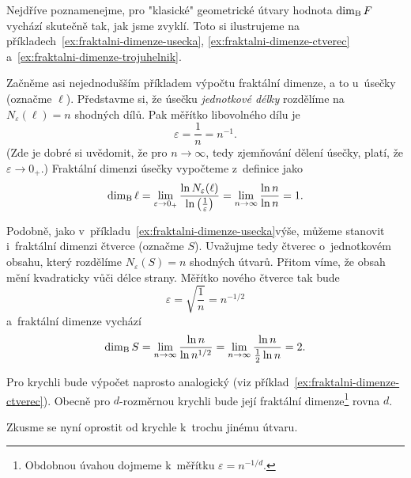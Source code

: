 Nejdříve poznamenejme, pro "klasické" geometrické útvary hodnota $\operatorname{dim_B}{F}$ vychází skutečně tak, jak jsme zvyklí. Toto si ilustrujeme na příkladech~\ref{ex:fraktalni-dimenze-usecka}, \ref{ex:fraktalni-dimenze-ctverec} a~\ref{ex:fraktalni-dimenze-trojuhelnik}.
\begin{example}\label{ex:fraktalni-dimenze-usecka}
    Začněme asi nejednodušším příkladem výpočtu fraktální dimenze, a to u~úsečky (označme $\ell$). Představme si, že úsečku \emph{jednotkové délky} rozdělíme na $N_\varepsilon(\ell)=n$ shodných dílů. Pak měřítko libovolného dílu je
    \[\varepsilon=\dfrac{1}{n}=n^{-1}.\]
    (Zde je dobré si uvědomit, že pro $n\to\infty$, tedy zjemňování dělení úsečky, platí, že $\varepsilon\to 0_+$.) Fraktální dimenzi úsečky vypočteme z~definice jako
    \[\operatorname{dim_B}{\ell}=\lim_{\varepsilon\to 0_+}{\dfrac{\ln{N_\varepsilon(\ell)}}{\ln{\left(\frac{1}{\varepsilon}\right)}}}=\lim_{n\to\infty}{\dfrac{\ln{n}}{\ln{n}}}=1.\]
\end{example}
\begin{example}\label{ex:fraktalni-dimenze-ctverec}
    Podobně, jako v~příkladu~\ref{ex:fraktalni-dimenze-usecka}\linebreak{}výše, můžeme stanovit i~fraktální dimenzi čtverce (označme $S$). Uvažujme tedy čtverec o~jednotkovém obsahu, který rozdělíme $N_\varepsilon(S)=n$ shodných útvarů. Přitom víme, že obsah mění kvadraticky vůči délce strany. Měřítko nového čtverce tak bude
    \[\varepsilon=\sqrt{\dfrac{1}{n}}=n^{-1/2}\]
    a~fraktální dimenze vychází
    \[\operatorname{dim_B}{S}=\lim_{n\to\infty}{\dfrac{\ln{n}}{\ln{n^{1/2}}}}=\lim_{n\to\infty}{\dfrac{\ln{n}}{\frac{1}{2}\ln{n}}}=2.\]
\end{example}
Pro krychli bude výpočet naprosto analogický (viz příklad~\ref{ex:fraktalni-dimenze-ctverec}). Obecně pro $d$-rozměrnou krychli bude její fraktální dimenze\footnote{Obdobnou úvahou dojmeme k~měřítku $\varepsilon=n^{-1/d}$.} rovna $d$.\par
Zkusme se nyní oprostit od krychle k~trochu jinému útvaru.
